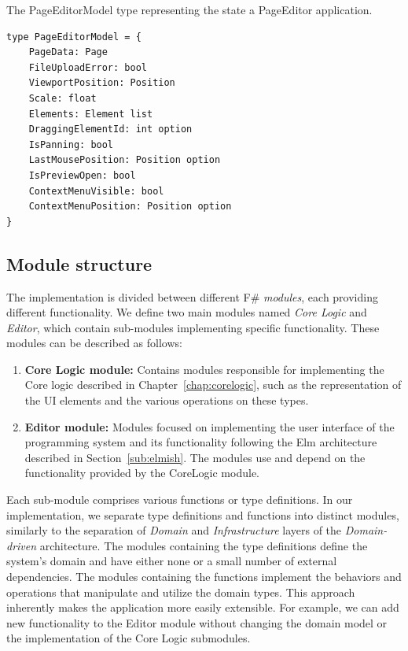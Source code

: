 \begin{listing}[htbp]
	\caption{The PageEditorModel type representing the state a PageEditor application.}
	\label{fig:editorModel}
	\begin{lstlisting}
type PageEditorModel = {
    PageData: Page
    FileUploadError: bool
    ViewportPosition: Position
    Scale: float
    Elements: Element list
    DraggingElementId: int option
    IsPanning: bool
    LastMousePosition: Position option
    IsPreviewOpen: bool
    ContextMenuVisible: bool
    ContextMenuPosition: Position option
}    
  \end{lstlisting}
\end{listing}
\medskip
\subsection{Module structure}
\nopagebreak[4]
The implementation is divided between different F\# \emph{modules}, each providing different functionality.
We define two main modules named \emph{Core Logic} and \emph{Editor}, which contain sub-modules implementing specific functionality.
These modules can be described as follows:
\begin{enumerate}
	\item \textbf{Core Logic module:} Contains modules responsible for implementing the Core logic described in Chapter~\ref{chap:corelogic}, such as the representation of the UI elements and the various operations on these types.
	\item \textbf{Editor module:} Modules focused on implementing the user interface of the programming system and its functionality following the Elm architecture described in Section~\ref{sub:elmish}.
	      The modules use and depend on the functionality provided by the CoreLogic module.
\end{enumerate}

Each sub-module comprises various functions or type definitions.
In our implementation, we separate type definitions and functions into distinct modules, similarly to the separation of \emph{Domain} and \emph{Infrastructure} layers of the \emph{Domain-driven} architecture.
The modules containing the type definitions define the system's domain and have either none or a small number of external dependencies.
The modules containing the functions implement the behaviors and operations that manipulate and utilize the domain types.
This approach inherently makes the application more easily extensible.
For example, we can add new functionality to the Editor module without changing the domain model or the implementation of the Core Logic submodules.
\medskip
